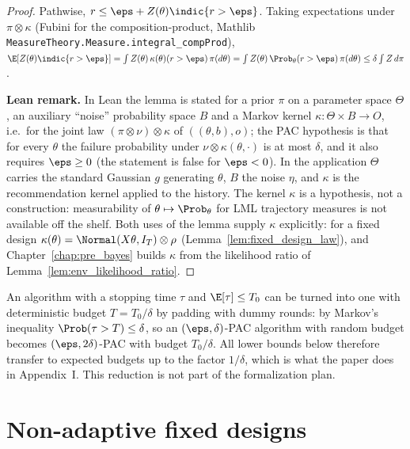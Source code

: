 \begin{proof}
\leanok
{}
Pathwise, $r \le \eps + Z(\theta)\indic\{r > \eps\}$. Taking expectations under
$\pi \otimes \kappa$ (Fubini for the composition-product, Mathlib
\texttt{MeasureTheory.Measure.integral\_compProd}),
$\E[Z(\theta)\indic\{r>\eps\}] = \int Z(\theta)\,\kappa(\theta)(r > \eps)\,\pi(d\theta)
= \int Z(\theta)\,\Prob_\theta(r > \eps)\,\pi(d\theta) \le \delta \int Z\,d\pi$.

\textbf{Lean remark.} In Lean the lemma is stated for a prior $\pi$ on a parameter space
$\Theta$, an auxiliary ``noise'' probability space $B$ and a Markov kernel
$\kappa : \Theta\times B \to O$, i.e.\ for the joint law $(\pi\otimes\nu)\otimes\kappa$ of
$((\theta, b), o)$; the PAC hypothesis is that for every $\theta$ the failure probability under
$\nu\otimes\kappa(\theta,\cdot)$ is at most $\delta$, and it also requires $\eps \ge 0$ (the
statement is false for $\eps < 0$). In the application $\Theta$ carries the standard Gaussian
$g$ generating $\theta$, $B$ the noise $\eta$, and $\kappa$ is the recommendation kernel applied
to the history. The kernel $\kappa$ is a hypothesis, not a construction: measurability of
$\theta \mapsto \Prob_\theta$ for LML trajectory measures is not available off the shelf. Both
uses of the lemma supply $\kappa$ explicitly: for a fixed design
$\kappa(\theta) = \Normal(X\theta, I_T) \otimes \rho$ (Lemma~\ref{lem:fixed_design_law}), and
Chapter~\ref{chap:pre_bayes} builds $\kappa$ from the likelihood ratio of
Lemma~\ref{lem:env_likelihood_ratio}.
\end{proof}

\begin{remark}\label{rem:stopping_times}
An algorithm with a stopping time $\tau$ and $\E[\tau] \le T_0$ can be turned into one with
deterministic budget $T = T_0/\delta$ by padding with dummy rounds: by Markov's inequality
$\Prob(\tau > T) \le \delta$, so an $(\eps,\delta)$-PAC algorithm with random budget becomes
$(\eps, 2\delta)$-PAC with budget $T_0/\delta$. All lower bounds below therefore transfer to
expected budgets up to the factor $1/\delta$, which is what the paper does in
Appendix~I. This reduction is not part of the formalization plan.
\end{remark}

\section{Non-adaptive fixed designs}
\label{sec:model_fixed}

